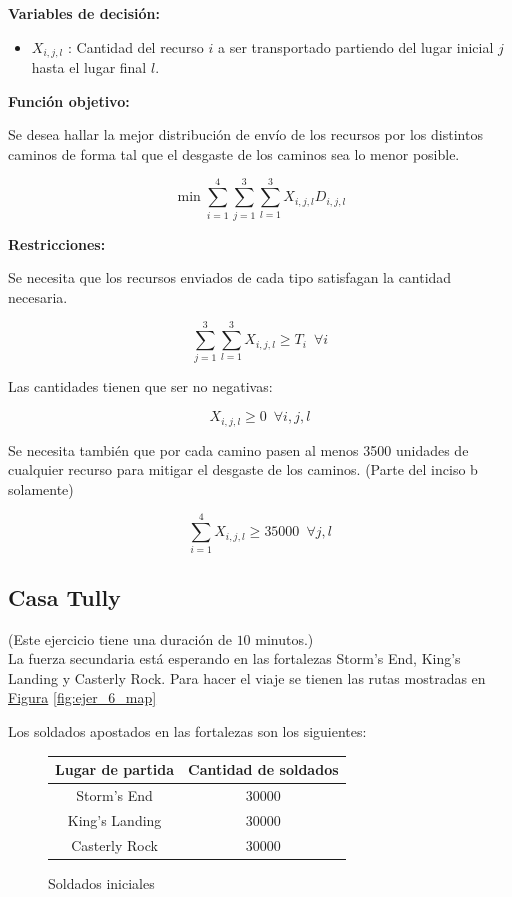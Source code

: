 \documentclass[a4paper,10pt,twocolumn]{article}
\theoremstyle{theorem}
\theoremstyle{definition}
\theoremstyle{remark}
\begin{document}
\textbf{Variables de decisión:}

\begin{itemize}
\item $X_{i,j,l}$ : Cantidad del recurso $i$ a ser transportado partiendo del lugar inicial $j$ hasta el lugar final $l$.
\end{itemize}

\textbf{Función objetivo:}

Se desea hallar la mejor distribución de envío de los recursos por los distintos caminos de forma tal que el desgaste de los caminos sea lo menor posible.

$$
\min \sum^{4}_{i=1} \sum^{3}_{j=1} \sum^{3}_{l=1} X_{i, j, l} D_{i, j, l}
$$

\textbf{Restricciones:}

Se necesita que los recursos enviados de cada tipo satisfagan la cantidad necesaria.

$$
\sum^{3}_{j=1} \sum^{3}_{l=1} X_{i, j, l} \geq T_{i} \enspace \forall i
$$

Las cantidades tienen que ser no negativas:

$$
X_{i, j, l} \geq 0 \enspace \forall i, j, l
$$

Se necesita también que por cada camino pasen al menos 3500 unidades de cualquier recurso para mitigar el desgaste de los caminos. (Parte del inciso b solamente)

$$
\sum^{4}_{i=1} X_{i, j, l} \geq 35000 \enspace \forall j, l
$$


	\subsection{Casa Tully}\label{subsec:ejer_6}
(Este ejercicio tiene una duración de $10$ minutos.)\\

La fuerza secundaria está esperando en las fortalezas Storm's End, King's Landing y Casterly Rock. Para hacer el viaje se tienen las rutas mostradas en \hyperref[fig:ejer_6_map]{Figura} \ref{fig:ejer_6_map}

Los soldados apostados en las fortalezas son los siguientes:

\begin{figure}[h!]%
	\begin{center}
		\begin{tabular}{|c|c|} \hline
		Lugar de partida & Cantidad de soldados  \\ \hline
		Storm's End		 & 30000				 \\ \hline
		King's Landing 	 & 30000				 \\ \hline
		Casterly Rock 	 & 30000		   		 \\ \hline
		\end{tabular}
	\caption{Soldados iniciales}\label{fig:ejer_6_1}
	\end{center}
\end{figure}
\end{document}
